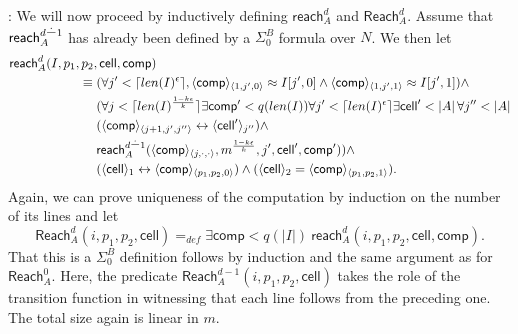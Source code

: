 \documentclass{LMCS}
\newcommand{\abs}[1]{\left\vert#1\right\vert}
\newcommand{\dotminus}{\mathbin{\setbox0\hbox{$-$}\setbox2\hbox to\wd0{\hss$^{\mkern1mu\cdot}$\hss}\wd2=0pt\box2\box0}}
\newenvironment{proof}{\QuadSpace\par\noindent{\bf
Proof}:}{\EndProof\HalfSpace} \fi
\newcommand{\QuadSpace}{}\newcommand{\HalfSpace}{}\newcommand{\FullSpace}{}\newcommand{\EndProof}{ \hfill \vrule width 1ex height 1ex depth 0pt }
\newenvironment{proof}{

\smallskip
\noindent\emph{Proof.}}{\hfill\(\Box\)
\bigskip
} \fi
\begin{document}
\begin{proof}
  We will now proceed by inductively defining $\mathsf{reach}^d_A$ and $\mathsf{Reach}^d_A$. Assume that
  $\mathsf{reach}^{d\dotminus 1}_A$ has already been defined by a $\Sigma^B_0$ formula over $N$. We then let
  \begin{equation*}
    \begin{split}
      \mathsf{reach}^d_A(I,p_1,&\,p_2,\mathsf{cell},\mathsf{comp})\\
 &\equiv  (\forall j'<\lceil len(I)^{\epsilon}\rceil,
      \langle\mathsf{comp}\rangle_{\langle 1,j',0\rangle} \approx  I[j',0]\land
      \langle\mathsf{comp}\rangle_{\langle 1,j',1\rangle} \approx
      I[j',1])\land\\
 &\phantom{{}\equiv{}}
      (\forall j<\lceil len(I)^{\frac{1-k\epsilon}{k}}\rceil\exists\mathsf{comp'}<q(len(I))\forall j'<\lceil
      len(I)^{\epsilon}\rceil\exists \mathsf{cell}'<\abs{A}\forall
      j''<\abs{A}\\
&\phantom{{}\equiv{}}
      (\langle\mathsf{comp}\rangle_{\langle
        j+1,j',j''\rangle}\leftrightarrow \langle
      \mathsf{cell}'\rangle_{j''})\land\\
&\phantom{{}\equiv{}}
      \mathsf{reach}^{d\dotminus 1}_A(\langle \mathsf{comp}\rangle_{\langle
      j,\cdot,\cdot\rangle},m^{\frac{1-k\epsilon}{k}},
      j',\mathsf{cell}',\mathsf{comp'}))\land\\
&\phantom{{}\equiv{}}
      (\langle \mathsf{cell}\rangle_1\leftrightarrow\langle\mathsf{comp}\rangle_{\langle p_1,p_2,0\rangle})\land
      (\langle \mathsf{cell}\rangle_2=\langle\mathsf{comp}\rangle_{\langle p_1,p_2,1\rangle}).
    \end{split}
  \end{equation*}
  Again, we can prove uniqueness of the computation by induction on the number of its lines and let
  $$\mathsf{Reach}^d_A(i,p_1,p_2,\mathsf{cell})=_{def}\exists\mathsf{comp}<q(\abs{I})\
  \mathsf{reach}^d_A(i,p_1,p_2,\mathsf{cell},\mathsf{comp}).$$ That this is a $\Sigma^B_0$ definition follows by
  induction and the same argument as for $\mathsf{Reach}^0_A$. Here, the predicate $\mathsf{Reach}^{d-1}_A(i,p_1,p_2,\mathsf{cell})$ takes the role of the transition function in witnessing that each line follows from the preceding one. The total size again is linear in $m$.



\end{proof}
\end{document}
